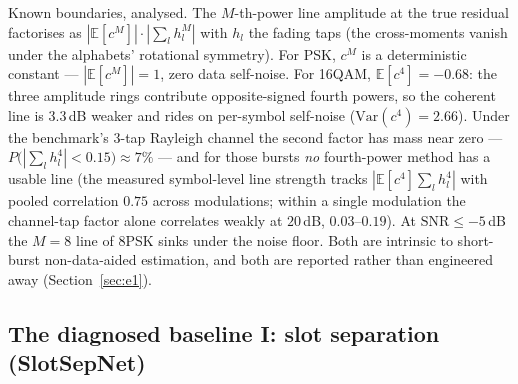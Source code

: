 \documentclass[journal]{IEEEtran}
\newcommand{\snr}{\mathrm{SNR}}
\begin{document}
Known boundaries, analysed. The $M$-th-power line amplitude at the true
residual factorises as $|\mathbb{E}[c^M]| \cdot |\sum_l h_l^M|$ with
$h_l$ the fading taps (the cross-moments vanish under the alphabets'
rotational symmetry). For PSK, $c^M$ is a deterministic constant ---
$|\mathbb{E}[c^M]| = 1$, zero data self-noise. For 16QAM,
$\mathbb{E}[c^4] = -0.68$: the three amplitude rings contribute
opposite-signed fourth powers, so the coherent line is $3.3$\,dB weaker
and rides on per-symbol self-noise ($\mathrm{Var}(c^4) = 2.66$). Under
the benchmark's 3-tap Rayleigh channel the second factor has mass near
zero ---
$P\big(|\sum_l h_l^4| < 0.15\big) \approx 7\%$ --- and for those bursts
\emph{no} fourth-power method has a usable line (the measured
symbol-level line strength tracks
$|\mathbb{E}[c^4] \sum_l h_l^4|$ with pooled correlation $0.75$
across modulations; within a single modulation the channel-tap factor
alone correlates weakly at $20$\,dB, $0.03$--$0.19$).
At
$\snr \leq -5$\,dB the $M{=}8$ line of 8PSK sinks under the noise
floor. Both are intrinsic to short-burst non-data-aided estimation, and
both are reported rather than engineered away (Section~\ref{sec:e1}).

\subsection{The diagnosed baseline I: slot separation (SlotSepNet)}
\label{sec:method-backbone}
\end{document}
